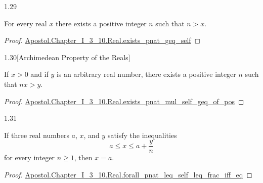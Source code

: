 \documentclass{article}
\begin{document}
\begin{xtheorem}{1.29}

For every real $x$ there exists a positive integer $n$ such that $n > x$.

\end{xtheorem}

\begin{proof}

\href{Chapter_I_3_10.lean}{Apostol.Chapter_I_3_10.Real.exists_pnat_geq_self}

\end{proof}

\begin{xtheorem}{1.30}[Archimedean Property of the Reals]

If $x > 0$ and if $y$ is an arbitrary real number, there exists a positive integer $n$ such that $nx > y$.

\end{xtheorem}

\begin{proof}

\href{Chapter_I_3_10.lean}{Apostol.Chapter_I_3_10.Real.exists_pnat_mul_self_geq_of_pos}

\end{proof}

\begin{xtheorem}{1.31}

If three real numbers $a$, $x$, and $y$ satisfy the inequalities
$$a \leq x \leq a + \frac{y}{n}$$
for every integer $n \geq 1$, then $x = a$.

\end{xtheorem}

\begin{proof}

\href{Chapter_I_3_10.lean}{Apostol.Chapter_I_3_10.Real.forall_pnat_leq_self_leq_frac_iff_eq}

\end{proof}
\end{document}

